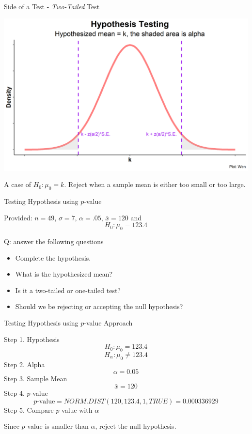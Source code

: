 \documentclass{beamer}
\begin{document}
\begin{frame}{Side of a Test - \textit{Two-Tailed} Test}

\begin{center}
\includegraphics[scale=0.5]{images/HypothesisTestingBothK.png}
\end{center}

A case of $H_0: \mu_0 = k$. Reject when a sample mean is either too small or too large.

\end{frame}


\begin{frame}{Testing Hypothesis using $p$-value}

Provided: $n = 49$, $\sigma = 7$, $\alpha = .05$, $\bar{x} = 120$ and 
$$ H_0: \mu_0 = 123.4 $$

Q: answer the following questions
\begin{itemize}
\item Complete the hypothesis.
\item What is the hypothesized mean? 
\item Is it a two-tailed or one-tailed test? 
\item Should we be rejecting or accepting the null hypothesis? 
\end{itemize}
\end{frame}

\begin{frame}{Testing Hypothesis using $p$-value Approach}

Step 1. Hypothesis
$$ H_0: \mu_0 = 123.4 $$
$$ H_\alpha: \mu_0 \neq 123.4 $$
Step 2. Alpha 
$$\alpha = 0.05$$
Step 3. Sample Mean
$$ \bar{x} = 120$$
Step 4. $p$-value
$$p\text{-value} = NORM.DIST(120, 123.4, 1, TRUE) = 0.000336929 $$ 
Step 5. Compare $p$-value with $\alpha$
\begin{center}
Since $p$-value is smaller than $\alpha$, reject the null hypothesis. 
\end{center}

\end{frame}
\end{document}
